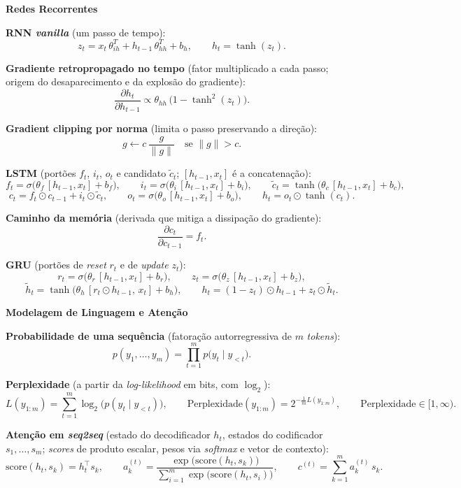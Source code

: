 \documentclass[11pt,a4paper]{article}
\newcommand{\bloco}[1]{%
  \par\vspace{0.3em}%
  {\bfseries\large #1}\par%
  \vspace{-0.4em}{\color{gray!60}\rule{\linewidth}{0.4pt}}\par%
}
\begin{document}
\bloco{Redes Recorrentes}

\textbf{RNN \textit{vanilla}} (um passo de tempo):
\[
  z_t = x_t\,\theta_{ih}^{T} + h_{t-1}\,\theta_{hh}^{T} + b_h,
  \qquad
  h_t = \tanh(z_t).
\]

\textbf{Gradiente retropropagado no tempo} (fator multiplicado a cada passo; origem do desaparecimento e da explosão do gradiente):
\[
  \frac{\partial h_t}{\partial h_{t-1}} \propto \theta_{hh}\,\bigl(1 - \tanh^{2}(z_t)\bigr).
\]

\textbf{Gradient clipping por norma} (limita o passo preservando a direção):
\[
  g \leftarrow c\,\frac{g}{\lVert g \rVert} \quad \text{se } \lVert g \rVert > c.
\]

\textbf{LSTM} (portões $f_t$, $i_t$, $o_t$ e candidato $\tilde{c}_t$; $[h_{t-1}, x_t]$ é a concatenação):
\[
  f_t = \sigma\bigl(\theta_f\,[h_{t-1}, x_t] + b_f\bigr), \qquad
  i_t = \sigma\bigl(\theta_i\,[h_{t-1}, x_t] + b_i\bigr), \qquad
  \tilde{c}_t = \tanh\bigl(\theta_c\,[h_{t-1}, x_t] + b_c\bigr),
\]
\[
  c_t = f_t \odot c_{t-1} + i_t \odot \tilde{c}_t, \qquad
  o_t = \sigma\bigl(\theta_o\,[h_{t-1}, x_t] + b_o\bigr), \qquad
  h_t = o_t \odot \tanh(c_t).
\]

\textbf{Caminho da memória} (derivada que mitiga a dissipação do gradiente):
\[
  \frac{\partial c_t}{\partial c_{t-1}} = f_t.
\]

\textbf{GRU} (portões de \textit{reset} $r_t$ e de \textit{update} $z_t$):
\[
  r_t = \sigma\bigl(\theta_r\,[h_{t-1}, x_t] + b_r\bigr), \qquad
  z_t = \sigma\bigl(\theta_z\,[h_{t-1}, x_t] + b_z\bigr),
\]
\[
  \tilde{h}_t = \tanh\bigl(\theta_h\,[r_t \odot h_{t-1},\, x_t] + b_h\bigr), \qquad
  h_t = (1 - z_t) \odot h_{t-1} + z_t \odot \tilde{h}_t.
\]

\bloco{Modelagem de Linguagem e Atenção}

\textbf{Probabilidade de uma sequência} (fatoração autorregressiva de $m$ \textit{tokens}):
\[
  p(y_1, \dots, y_m) = \prod_{t=1}^{m} p\bigl(y_t \mid y_{<t}\bigr).
\]

\textbf{Perplexidade} (a partir da \textit{log-likelihood} em bits, com $\log_2$):
\[
  L(y_{1:m}) = \sum_{t=1}^{m} \log_2\bigl(p(y_t \mid y_{<t})\bigr),
  \qquad
  \text{Perplexidade}(y_{1:m}) = 2^{-\frac{1}{m} L(y_{1:m})},
  \qquad
  \text{Perplexidade} \in [1, \infty).
\]

\textbf{Atenção em \textit{seq2seq}} (estado do decodificador $h_t$, estados do codificador $s_1, \dots, s_m$; \textit{scores} de produto escalar, pesos via \textit{softmax} e vetor de contexto):
\[
  \mathrm{score}(h_t, s_k) = h_t^{\top} s_k,
  \qquad
  a_k^{(t)} = \frac{\exp\bigl(\mathrm{score}(h_t, s_k)\bigr)}{\sum_{i=1}^{m}\exp\bigl(\mathrm{score}(h_t, s_i)\bigr)},
  \qquad
  c^{(t)} = \sum_{k=1}^{m} a_k^{(t)}\, s_k.
\]
\end{document}
